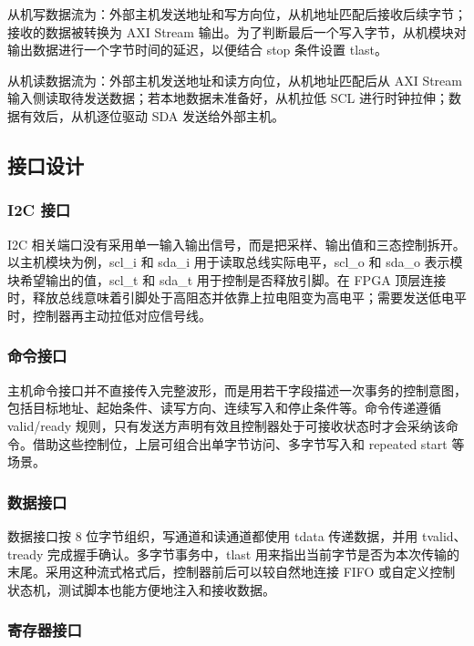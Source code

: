 \documentclass[12pt,a4paper]{article}
\numberwithin{equation}{section}
\begin{document}
从机写数据流为：外部主机发送地址和写方向位，从机地址匹配后接收后续字节；接收的数据被转换为
AXI Stream
输出。为了判断最后一个写入字节，从机模块对输出数据进行一个字节时间的延迟，以便结合
stop 条件设置 tlast。

从机读数据流为：外部主机发送地址和读方向位，从机地址匹配后从 AXI Stream
输入侧读取待发送数据；若本地数据未准备好，从机拉低 SCL
进行时钟拉伸；数据有效后，从机逐位驱动 SDA 发送给外部主机。

\subsection{接口设计}\label{ux63a5ux53e3ux8bbeux8ba1}

\subsubsection{I2C 接口}\label{i2c-ux63a5ux53e3}

I2C
相关端口没有采用单一输入输出信号，而是把采样、输出值和三态控制拆开。以主机模块为例，scl\_i
和 sda\_i
用于读取总线实际电平，scl\_o 和
sda\_o
表示模块希望输出的值，scl\_t 和
sda\_t 用于控制是否释放引脚。在 FPGA
顶层连接时，释放总线意味着引脚处于高阻态并依靠上拉电阻变为高电平；需要发送低电平时，控制器再主动拉低对应信号线。

\subsubsection{命令接口}\label{ux547dux4ee4ux63a5ux53e3}

主机命令接口并不直接传入完整波形，而是用若干字段描述一次事务的控制意图，包括目标地址、起始条件、读写方向、连续写入和停止条件等。命令传递遵循
valid/ready
规则，只有发送方声明有效且控制器处于可接收状态时才会采纳该命令。借助这些控制位，上层可组合出单字节访问、多字节写入和
repeated start 等场景。

\subsubsection{数据接口}\label{ux6570ux636eux63a5ux53e3}

数据接口按 8 位字节组织，写通道和读通道都使用
tdata 传递数据，并用
tvalid、tready
完成握手确认。多字节事务中，tlast
用来指出当前字节是否为本次传输的末尾。采用这种流式格式后，控制器前后可以较自然地连接
FIFO 或自定义控制状态机，测试脚本也能方便地注入和接收数据。

\subsubsection{寄存器接口}\label{ux5bc4ux5b58ux5668ux63a5ux53e3}
\end{document}
